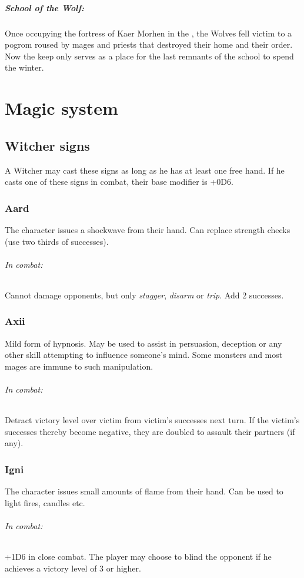 \documentclass[parskip=full,11pt,%
footheight=38pt]{scrreport}
\begin{document}
\paragraph{School of the Wolf:}
Once occupying the fortress of Kaer Morhen in the , the Wolves fell victim to a pogrom roused by
mages and priests that destroyed their home and their order. Now the keep only serves as a place for the last remnants of
the school to spend the winter.

\chapter{Magic system}
\section{Witcher signs}\label{rule:signs}
A Witcher may cast these signs as long as he has at least one free hand. If he casts one of these signs in
combat, their base modifier is +0D6.

\subsection{Aard}
The character issues a shockwave from their hand. Can replace strength checks (use two thirds of successes).

\subparagraph{In combat:} Cannot damage opponents, but only \textit{stagger}, \textit{disarm} or \textit{trip}. Add 2 successes.

\subsection{Axii}
Mild form of hypnosis. May be used to assist in persuasion, deception or any other skill attempting to influence
someone's mind. Some monsters and most mages are immune to such manipulation.

\subparagraph{In combat:} Detract victory level over victim from victim's successes next turn. If the victim's
successes thereby become negative, they are doubled to assault their partners (if any).

\subsection{Igni}
The character issues small amounts of flame from their hand. Can be used to light fires, candles etc.

\subparagraph{In combat:} +1D6 in close combat. The player may choose to blind the opponent
if he achieves a victory level of 3 or higher.
\end{document}
